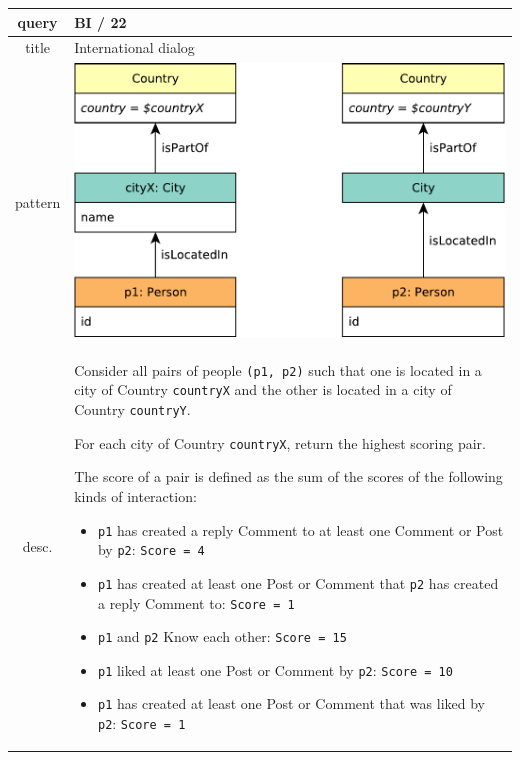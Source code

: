 \renewcommand*{\arraystretch}{1.1}

\noindent\begin{tabularx}{17cm}{|>{\small \sf}c|X|}
	\hline
	query    & BI / 22 \\ \hline
%
	title       & International dialog \\ \hline
%
    pattern     & \hfill\includegraphics[scale=\patternscale,margin=0cm .2cm]{patterns/bi-read-22}\hfill\vadjust{} \\ \hline
%
	desc. & Consider all pairs of people \texttt{(p1,\ p2)} such that one is located
in a city of Country \texttt{countryX} and the other is located in a
city of Country \texttt{countryY}.

For each city of Country \texttt{countryX}, return the highest scoring
pair.

The score of a pair is defined as the sum of the scores of the following
kinds of interaction:

\begin{itemize}
\tightlist
\item
  \texttt{p1} has created a reply Comment to at least one Comment or
  Post by \texttt{p2}: \texttt{Score\ =\ 4}
\item
  \texttt{p1} has created at least one Post or Comment that \texttt{p2}
  has created a reply Comment to: \texttt{Score\ =\ 1}
\item
  \texttt{p1} and \texttt{p2} Know each other: \texttt{Score\ =\ 15}
\item
  \texttt{p1} liked at least one Post or Comment by \texttt{p2}:
  \texttt{Score\ =\ 10}
\item
  \texttt{p1} has created at least one Post or Comment that was liked by
  \texttt{p2}: \texttt{Score\ =\ 1}
\end{itemize}


\end{tabularx}
